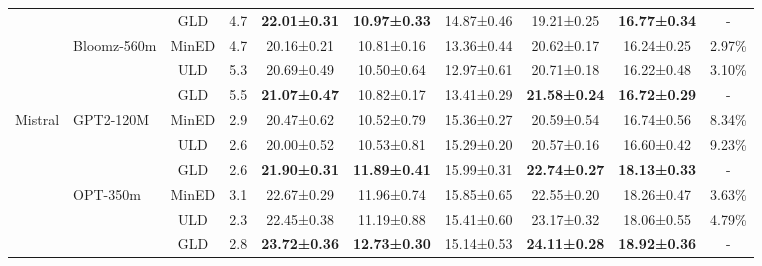 \documentclass{article}
\begin{document}
\begin{table}[t]
{\begin{tabular}{l|l|ccccccc|c}
                                             &                                 & GLD                  & 4.7     & \textbf{22.01±0.31} & \textbf{10.97±0.33} & 14.87±0.46          & 19.21±0.25          & \textbf{16.77±0.34} & -       \\
                                             & \multirow{3}{*}{Bloomz-560m}    & MinED                & 4.7     & 20.16±0.21          & 10.81±0.16          & 13.36±0.44          & 20.62±0.17          & 16.24±0.25          & 2.97\%  \\
                                             &                                 & ULD                  & 5.3     & 20.69±0.49          & 10.50±0.64          & 12.97±0.61          & 20.71±0.18          & 16.22±0.48          & 3.10\%  \\
                                             &                                 & GLD                  & 5.5     & \textbf{21.07±0.47} & 10.82±0.17          & 13.41±0.29          & \textbf{21.58±0.24} & \textbf{16.72±0.29} & -       \\
\midrule
\multirow{9}{*}{Mistral}                     & \multirow{3}{*}{GPT2-120M}      & MinED                & 2.9     & 20.47±0.62          & 10.52±0.79          & 15.36±0.27          & 20.59±0.54          & 16.74±0.56          & 8.34\%  \\
                                             &                                 & ULD                  & 2.6     & 20.00±0.52          & 10.53±0.81          & 15.29±0.20          & 20.57±0.16          & 16.60±0.42          & 9.23\%  \\
                                             &                                 & GLD                  & 2.6     & \textbf{21.90±0.31} & \textbf{11.89±0.41} & 15.99±0.31          & \textbf{22.74±0.27} & \textbf{18.13±0.33} & -       \\
                                             & \multirow{3}{*}{OPT-350m}       & MinED                & 3.1     & 22.67±0.29          & 11.96±0.74          & 15.85±0.65          & 22.55±0.20          & 18.26±0.47          & 3.63\%  \\
                                             &                                 & ULD                  & 2.3     & 22.45±0.38          & 11.19±0.88          & 15.41±0.60          & 23.17±0.32          & 18.06±0.55          & 4.79\%  \\
                                             &                                 & GLD                  & 2.8     & \textbf{23.72±0.36} & \textbf{12.73±0.30} & 15.14±0.53          & \textbf{24.11±0.28} & \textbf{18.92±0.36} & -       \\

\end{tabular}}
\end{table}
\end{document}
